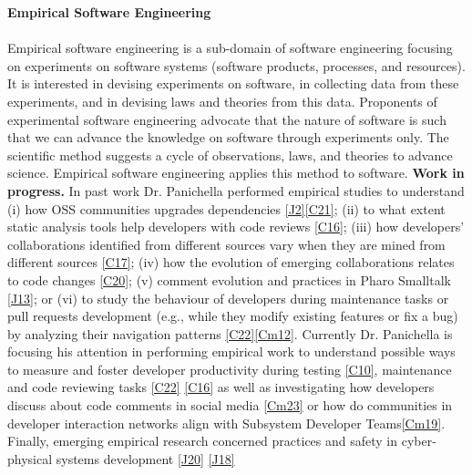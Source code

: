 \documentclass[10pt]{article}
\newcommand{\blankline}{\quad\pagebreak[3]}
\begin{document}
\textbf{Empirical Software Engineering}
\blankline\\\\
Empirical software engineering is a sub-domain of software engineering focusing on experiments on software systems (software products, processes, and resources). It is interested in devising experiments on software, in collecting data from these experiments, and in devising laws and theories from this data. Proponents of experimental software engineering advocate that the nature of software is such that we can advance the knowledge on software through experiments only. The scientific method suggests a cycle of observations, laws, and theories to advance science. Empirical software engineering applies this method to software.
   \textbf{Work in progress.} In past work Dr. Panichella performed empirical studies to understand (i) how   OSS communities upgrades dependencies \ref{J2}\ref{C21};   
   (ii) to what extent static analysis tools help developers with code reviews \ref{C16};  (iii)  how developers' collaborations identified from different sources vary when they are mined from different sources \ref{C17};  (iv) how the evolution of emerging collaborations relates to code changes \ref{C20}; (v) comment evolution and practices in Pharo Smalltalk \ref{J13}; or (vi) to study
   the behaviour of developers during maintenance tasks or pull requests development (e.g., while they modify existing features or fix a bug) by analyzing their navigation patterns  \ref{C22}\ref{Cm12}. Currently Dr. Panichella is focusing his attention in performing empirical work to understand possible ways to measure and foster developer  productivity during testing \ref{C10}, maintenance and code reviewing tasks \ref{C22} \ref{C16} as well as investigating how developers discuss about code comments in social media \ref{Cm23} or how do communities in developer interaction networks align with Subsystem Developer Teams\ref{Cm19}.
   Finally, emerging empirical research concerned practices and
   safety in cyber-physical systems development \ref{J20} \ref{J18}
   \\
   
\end{document}
